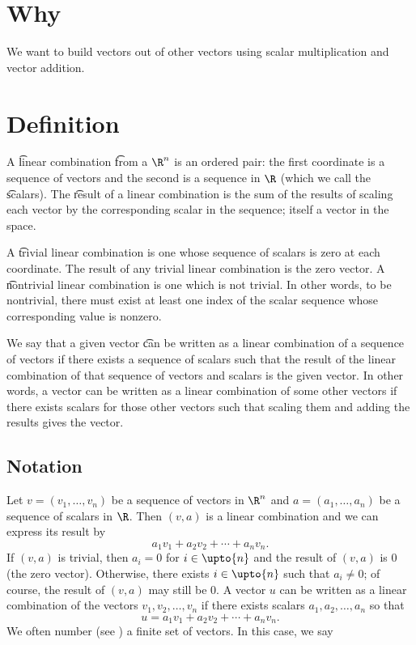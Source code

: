 

\section*{Why}

We want to build vectors out of other vectors using scalar multiplication and vector addition.

\section*{Definition}

A \t{linear combination} \t{from} a $\R ^n$ is an ordered pair: the first coordinate is a sequence of vectors and the second is a sequence in $\R $ (which we call the \t{scalars}).
The \t{result} of a linear combination is the sum of the results of scaling each vector by the corresponding scalar in the sequence; itself a vector in the space.

A \t{trivial linear combination} is one whose sequence of scalars is zero at each coordinate.
The result of any trivial linear combination is the zero vector.
A \t{nontrivial linear combination} is one which is not trivial.
In other words, to be nontrivial, there must exist at least one index of the scalar sequence whose corresponding value is nonzero.

We say that a given vector \t{can be written as a linear combination of} a sequence of vectors if there exists a sequence of scalars such that the result of the linear combination of that sequence of vectors and scalars is the given vector.
In other words, a vector can be written as a linear combination of some other vectors if there exists scalars for those other vectors such that scaling them and adding the results gives the vector.

\subsection*{Notation}

Let $v = (v_1, \dots , v_n)$ be a sequence of vectors in $\R ^n$ and
$a = (a_1, \dots , a_n)$ be a sequence of scalars in $\R $.
Then $(v, a)$ is a linear combination and we can express its result by
    \[
a_1v_1 + a_2v_2 + \cdots + a_n v_n.
    \]
If $(v,a)$ is trivial, then $a_i = 0$ for $i \in \upto{n}$ and the result of $(v, a)$ is $0$ (the zero vector).
Otherwise, there exists $i \in \upto{n}$ such that $a_i \neq 0$; of course, the result of $(v, a)$ may still be $0$.
A vector $u$ can be written as a linear combination of the vectors $v_1, v_2, \dots , v_n$ if there exists scalars $a_1, a_2, \dots , a_n$ so that
      \[
u = a_1v_1 + a_2v_2 + \cdots + a_nv_n.
      \]
We often number (see ) a finite set of vectors.
In this case, we say 

